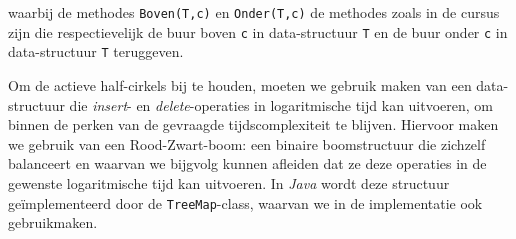 \documentclass[12pt]{article}
\begin{document}
waarbij de methodes \texttt{Boven(T,c)} en \texttt{Onder(T,c)} de methodes zoals in de cursus zijn die respectievelijk de buur boven \texttt{c} in data-structuur \texttt{T} en de buur onder \texttt{c} in data-structuur \texttt{T} teruggeven.


Om de actieve half-cirkels bij te houden, moeten we gebruik maken van een data-structuur die \textit{insert}- en \textit{delete}-operaties in logaritmische tijd kan uitvoeren, om binnen de perken van de gevraagde tijdscomplexiteit te blijven. Hiervoor maken we gebruik van een Rood-Zwart-boom: een binaire boomstructuur die zichzelf balanceert en waarvan we bijgvolg kunnen afleiden dat ze deze operaties in de gewenste logaritmische tijd kan uitvoeren. In \textit{Java} wordt deze structuur geïmplementeerd door de \texttt{TreeMap}-class, waarvan we in de implementatie ook gebruikmaken.
\end{document}

